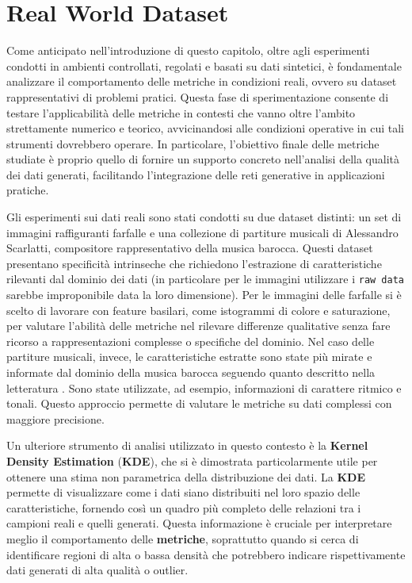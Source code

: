 \section{Real World Dataset}
\label{sec:real-world-dataset}

Come anticipato nell'introduzione di questo capitolo, oltre agli esperimenti condotti in ambienti controllati, 
regolati e basati su dati sintetici, è fondamentale analizzare il comportamento delle metriche in condizioni reali, 
ovvero su dataset rappresentativi di problemi pratici. Questa fase di sperimentazione consente di testare l'applicabilità 
delle metriche in contesti che vanno oltre l’ambito strettamente numerico e teorico, avvicinandosi alle condizioni operative 
in cui tali strumenti dovrebbero operare. In particolare, l’obiettivo finale delle metriche studiate è proprio quello 
di fornire un supporto concreto nell’analisi della qualità dei dati generati, facilitando l’integrazione delle reti generative in applicazioni pratiche.

Gli esperimenti sui dati reali sono stati condotti su due dataset distinti: un set di immagini raffiguranti farfalle 
e una collezione di partiture musicali di Alessandro Scarlatti, compositore rappresentativo della musica barocca. 
Questi dataset presentano specificità intrinseche che richiedono l’estrazione di caratteristiche rilevanti dal dominio dei dati (in particolare per le immagini utilizzare i \texttt{raw data} sarebbe improponibile data la loro dimensione). 
Per le immagini delle farfalle si è scelto di lavorare con feature basilari, come istogrammi di colore e saturazione, per valutare l’abilità delle metriche nel rilevare differenze qualitative senza fare ricorso a rappresentazioni complesse o specifiche del dominio.
Nel caso delle partiture musicali, invece, le caratteristiche estratte sono state più mirate e informate dal dominio della musica barocca seguendo quanto descritto nella letteratura \cite{8OnTheEvaluationOfGenerativeModelsInMusic}. 
Sono state utilizzate, ad esempio, informazioni di carattere ritmico e tonali. Questo approccio permette di valutare le metriche su dati complessi con maggiore precisione.

Un ulteriore strumento di analisi utilizzato in questo contesto è la \textbf{Kernel Density Estimation} (\textbf{KDE}), che si è dimostrata particolarmente utile per ottenere una stima non parametrica della distribuzione dei dati. 
La \textbf{KDE} permette di visualizzare come i dati siano distribuiti nel loro spazio delle caratteristiche, fornendo così un quadro più completo delle relazioni tra i campioni reali e quelli generati. 
Questa informazione è cruciale per interpretare meglio il comportamento delle \textbf{metriche}, soprattutto quando si cerca di identificare regioni di alta o bassa densità che potrebbero indicare rispettivamente dati generati di alta qualità o outlier.

